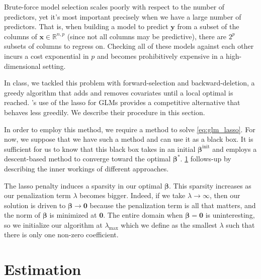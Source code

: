 \documentclass[letterpaper, 12pt]{article}
\newcommand{\bbeta}{\bm \beta}
\begin{document}
Brute-force model selection scales poorly with respect to the number of
predictors, yet it's most important precisely when we have a large number of
predictors. That is, when building a model to predict $\bm{y}$ from a subset of
the columns of $\bm{x} \in \mathbb{R}^{n,p}$ (since not all columns may be
predictive), there are $2^p$ subsets of columns to regress on. Checking all of
these models against each other incurs a cost exponential in $p$ and becomes
prohibitively expensive in a high-dimensional setting.

In class, we tackled this problem with forward-selection and backward-deletion,
a greedy algorithm that adds and removes covariates until a local optimal is
reached. \cite{park2007l1}'s use of the lasso for GLMs provides a competitive
alternative that behaves less greedily. We describe their procedure in this
section.

In order to employ this method, we require a method to solve
\eqref{eq:glm_lasso}. For now, we suppose that we have such a method and can use
it as a black box. It is sufficient for us to know that this black box takes in
an initial $\bbeta^\text{init}$ and employs a descent-based method to converge
toward the optimal $\bbeta^*$. \cref{sec:estimation} follows-up by describing
the inner workings of different approaches.

The lasso penalty induces a sparsity in our optimal $\bbeta$. This sparsity
increases as our penalization term $\lambda$ becomes bigger. Indeed, if we take
$\lambda \to \infty$, then our solution is driven to $\bbeta \to \bm{0}$ because
the penalization term is all that matters, and the norm of $\bbeta$ is minimized
at $\bm{0}$. The entire domain when $\bbeta = \bm{0}$ is uninteresting, so we
initialize our algorithm at $\lambda_\text{max}$ which we define as the smallest
$\lambda$ such that there is only one non-zero coefficient.



\section{Estimation}
\label{sec:estimation}
\end{document}
